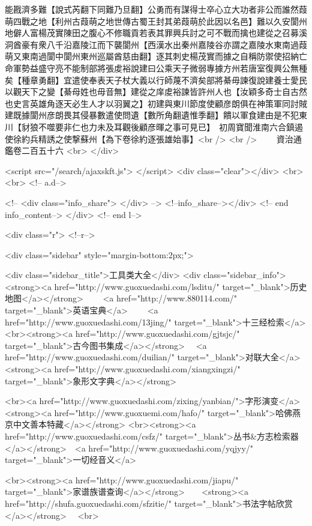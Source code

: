 能戡濟多難【說式芮翻下同難乃旦翻】公勇而有謀得士卒心立大功者非公而誰然葭萌四戰之地【利州古葭萌之地世傳古蜀王封其弟葭萌於此因以名邑】難以久安閬州地僻人富楊茂實陳田之腹心不修職貢若表其罪興兵討之可不戰而擒也建從之召募溪洞酋豪有衆八千沿嘉陵江而下襲閬州【西漢水出秦州嘉陵谷亦謂之嘉陵水東南過葭萌又東南過閬中閬州東州巡屬酋慈由翻】逐其刺史楊茂實而據之自稱防禦使招納亡命軍勢益盛守亮不能制部將張䖍裕說建曰公乘天子微弱專據方州若唐室復興公無種矣【種章勇翻】宜遣使奉表天子杖大義以行師蔑不濟矣部將綦毋諫復說建養士愛民以觀天下之變【綦母姓也毋音無】建從之庠䖍裕諫皆許州人也【汝穎多奇士自古然也史言英雄角逐天必生人才以羽翼之】初建與東川節度使顧彦朗俱在神策軍同討賊建既據閬州彦朗畏其侵暴數遣使問遺【數所角翻遺惟季翻】饋以軍食建由是不犯東川【豺狼不噬要非仁也力未及耳觀後顧彦暉之事可見已】　初周寶聞淮南六合鎮遏使徐約兵精誘之使撃蘇州【為下卷徐約逐張雄始事】<br />
<br />
　　資治通鑑卷二百五十六  <br>
   </div> 

<script src="/search/ajaxskft.js"> </script>
 <div class="clear"></div>
<br>
<br>
 <!-- a.d-->

 <!--
<div class="info_share">
</div> 
-->
 <!--info_share--></div>   <!-- end info_content-->
  </div> <!-- end l-->

<div class="r">   <!--r-->



<div class="sidebar"  style="margin-bottom:2px;">

 
<div class="sidebar_title">工具类大全</div>
<div class="sidebar_info">
<strong><a href="http://www.guoxuedashi.com/lsditu/" target="_blank">历史地图</a></strong>　　
<a href="http://www.880114.com/" target="_blank">英语宝典</a>　　
<a href="http://www.guoxuedashi.com/13jing/" target="_blank">十三经检索</a>　
<br><strong><a href="http://www.guoxuedashi.com/gjtsjc/" target="_blank">古今图书集成</a></strong>　
<a href="http://www.guoxuedashi.com/duilian/" target="_blank">对联大全</a>　<strong><a href="http://www.guoxuedashi.com/xiangxingzi/" target="_blank">象形文字典</a></strong>　

<br><a href="http://www.guoxuedashi.com/zixing/yanbian/">字形演变</a>　　<strong><a href="http://www.guoxuemi.com/hafo/" target="_blank">哈佛燕京中文善本特藏</a></strong>
<br><strong><a href="http://www.guoxuedashi.com/csfz/" target="_blank">丛书&方志检索器</a></strong>　<a href="http://www.guoxuedashi.com/yqjyy/" target="_blank">一切经音义</a>　　

<br><strong><a href="http://www.guoxuedashi.com/jiapu/" target="_blank">家谱族谱查询</a></strong>　　<strong><a href="http://shufa.guoxuedashi.com/sfzitie/" target="_blank">书法字帖欣赏</a></strong>　
<br>

